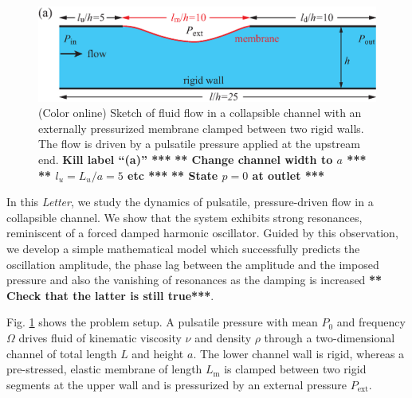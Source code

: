 \documentclass[aps,prl,reprint,superscriptaddress,floatfix]{revtex4-1}
\begin{document}

\begin{figure}
	\includegraphics[width=1\linewidth, trim={0cm 0cm -0.35cm 0cm}, clip]{./epsFig/fig1a.eps}
	\caption{\label{fig:setup}(Color online) Sketch of fluid
          flow in a collapsible channel with an externally pressurized
          membrane clamped between two rigid walls. The flow is driven
          by a pulsatile pressure applied at the upstream end.
          {\bf Kill label ``(a)'' ***}
          {\bf *** Change channel width to $a$ ***}
                    {\bf *** $l_{u} = L_{u}/a = 5$ etc ***}
          {\bf *** State $p=0$ at outlet ***}}
\end{figure}

In this \emph{Letter}, we study the dynamics of pulsatile,
pressure-driven flow in a collapsible channel. We show that the
system exhibits strong resonances, reminiscent of a
forced damped harmonic oscillator. Guided by this observation, we develop
a simple mathematical model which successfully predicts the
oscillation amplitude, the phase lag between the
amplitude and the imposed pressure and also the vanishing of resonances
as the damping is increased {\bf *** Check that the latter is still true***}.

Fig. \ref{fig:setup} shows the problem setup.
A pulsatile pressure with mean $P_0$ and frequency $\Omega$
drives fluid of kinematic viscosity $\nu$ and density $\rho$
through a two-dimensional channel of total length $L$ and height $a$.
The lower channel wall is rigid, whereas a pre-stressed, elastic
membrane of length $L_\text{m}$ is clamped
between two rigid segments at the upper wall and is pressurized by an external
pressure $P_\text{ext}$.
\end{document}
